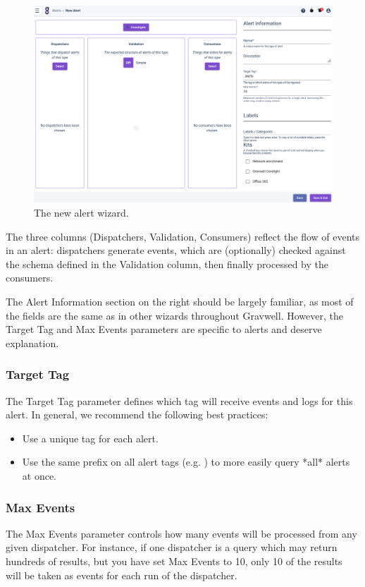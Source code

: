 \begin{figure}
	\includegraphics[width=0.85\linewidth]{images/newalert.png}
	\caption{The new alert wizard.}
	\label{fig:newalert}
\end{figure}

The three columns (Dispatchers, Validation, Consumers) reflect the flow of events in an alert: dispatchers generate events, which are (optionally) checked against the schema defined in the Validation column, then finally processed by the consumers.

The Alert Information section on the right should be largely familiar, as most of the fields are the same as in other wizards throughout Gravwell. However, the Target Tag and Max Events parameters are specific to alerts and deserve explanation.

\subsubsection{Target Tag}
The Target Tag parameter defines which tag will receive events and logs for this alert. In general, we recommend the following best practices:

\begin{itemize}
  \tightlist
  \item Use a unique tag for each alert.
  \item Use the same prefix on all alert tags (e.g. ) to more easily query *all* alerts at once.
\end{itemize}

\subsubsection{Max Events}

The Max Events parameter controls how many events will be processed from any given dispatcher. For instance, if one dispatcher is a query which may return hundreds of results, but you have set Max Events to 10, only 10 of the results will be taken as events for each run of the dispatcher.

